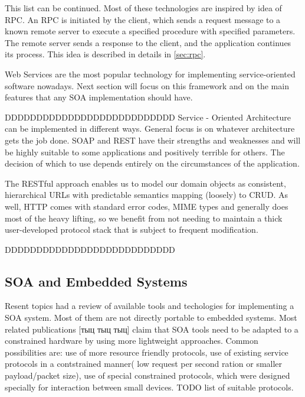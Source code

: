 This list can be continued. Most of these technologies are inspired by idea
of \gls{RPC}. An \gls{RPC} is initiated by the client, which sends a request
message to a known remote server to execute a specified procedure with specified
parameters. The remote server sends a response to the client, and the application continues its process.
This idea is described in details in \autoref{sec:rpc}.



Web Services are the most popular technology for implementing
service-oriented software nowadays. Next section will focus on this framework
and on the main features that any \gls{SOA} implementation should have.





DDDDDDDDDDDDDDDDDDDDDDDDDDD
Service
-
Oriented Architecture can be implemented in different ways. General focus is on
whatever architecture gets the job done. SOAP and REST have their strengths and weaknesses
and will be highly suitable to some
applications and positively terrible for others. The decision of
which to use depends entirely on the circumstances of the application.

The RESTful approach enables us to model our domain objects as consistent,
hierarchical URLs with predictable semantics mapping (loosely) to CRUD.  As well, HTTP comes with standard error codes, MIME types and generally does most of the heavy lifting, so we benefit from not needing to maintain a thick user-developed protocol stack that is subject to frequent modification.

DDDDDDDDDDDDDDDDDDDDDDDDDDD

\subsection{SOA and Embedded Systems}

Resent topics had a review of available tools and techologies for implementing a
\gls{SOA} system. Most of them are not directly portable to embedded systems.
Most related publications [тыц тыц тыц] claim that SOA tools need to be adapted
to a constrained hardware by using more lightweight approaches.
Common possibilities are: use of more resource friendly protocols, use of
existing service protocols in a contstrained manner( low request per second
ration or smaller payload/packet size), use of special constrained protocols,
which were designed specially for interaction between small devices.
TODO list of suitable  protocols.

